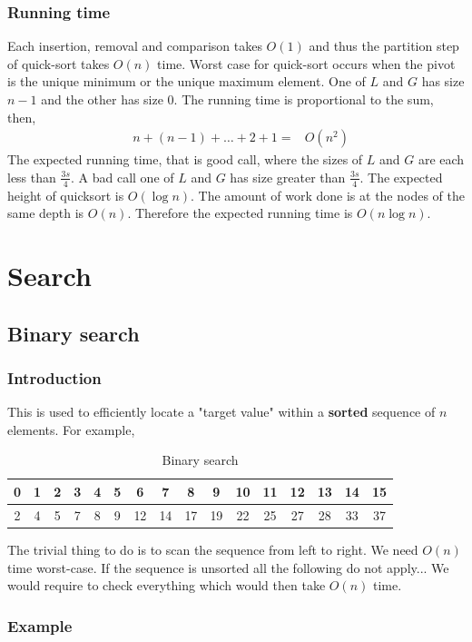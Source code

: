 \documentclass[a4paper]{article}
\theoremstyle{plain}
\theoremstyle{definition}
\theoremstyle{remark}
\begin{document}
\subsubsection{Running time}
Each insertion, removal and comparison takes $O(1)$ and thus the partition step of quick-sort takes $O(n)$ time. Worst case for quick-sort occurs when the pivot is the unique minimum or the unique maximum element. One of $L$ and $G$ has size $n-1$ and the other has size $0$. The running time is proportional to the sum, then,
\begin{align*}
	&n + (n-1) + \ldots + 2 + 1
	=& O(n^2)
\end{align*}
The expected running time, that is good call, where the sizes of $ L$ and $G$ are each less than $\frac{3s}{4}$. A bad call one of $L$ and $G$ has size greater than $\frac{3s}{4}$. The expected height of quicksort is $O(\log n)$. The amount of work done is at the nodes of the same depth is $O(n)$. Therefore the expected running time is $O(n \log n)$.
\section{Search}
\subsection{Binary search}
\subsubsection{Introduction}
This is used to efficiently locate a "target value" within a \textbf{sorted} sequence of $n$ elements. For example,
\begin{table}[H]
	\centering
	\caption{Binary search}
	\label{tab:binarysearch}
	\begin{tabular}{|c|c|c|c|c|c|c|c|c|c|c|c|c|c|c|c|} \hline
		0 & 1 &2  &3  &4  &5  &6  &7& 8 &9  &10  & 11 & 12 & 13 & 14 & 15 \\
		\hline
		2 & 4 & 5 & 7 & 8 & 9 & 12 & 14 & 17 & 19 & 22 & 25 &27 & 28& 33 & 37\\ \hline
	\end{tabular}
\end{table}
The trivial thing to do is to scan the sequence from left to right. We need $O(n)$ time worst-case. If the sequence is unsorted all the following do not apply... We would require to check everything which would then take $O(n)$ time. 
\subsubsection{Example}
\end{document}
